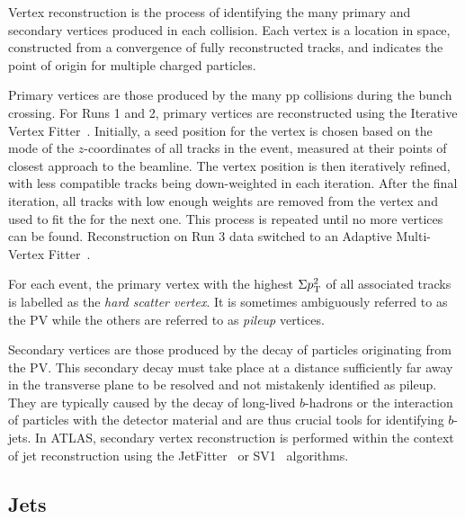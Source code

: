 Vertex reconstruction is the process of identifying the many primary and secondary vertices produced in each collision.
Each vertex is a location in space, constructed from a convergence of fully reconstructed tracks, and indicates the point of origin for multiple charged particles.

Primary vertices are those produced by the many \Gls{pp} collisions during the bunch crossing.
For Runs 1 and 2, primary vertices are reconstructed using the Iterative Vertex Fitter~\cite{ATLASVertex}.
Initially, a seed position for the vertex is chosen based on the mode of the $z$-coordinates of all tracks in the event, measured at their points of closest approach to the beamline.
The vertex position is then iteratively refined, with less compatible tracks being down-weighted in each iteration.
After the final iteration, all tracks with low enough weights are removed from the vertex and used to fit the for the next one.
This process is repeated until no more vertices can be found.
Reconstruction on Run 3 data switched to an Adaptive Multi-Vertex Fitter~\cite{Run3Vertex}.

For each event, the primary vertex with the highest $\Sigma p_\mathrm{T}^2$ of all associated tracks is labelled as the \textit{hard scatter vertex}.
It is sometimes ambiguously referred to as the \Gls{PV} while the others are referred to as \textit{pileup} vertices.

Secondary vertices are those produced by the decay of particles originating from the \Gls{PV}.
This secondary decay must take place at a distance sufficiently far away in the transverse plane to be resolved and not mistakenly identified as pileup.
They are typically caused by the decay of long-lived $b$-hadrons or the interaction of particles with the detector material and are thus crucial tools for identifying $b$-jets.
In ATLAS, secondary vertex reconstruction is performed within the context of jet reconstruction using the JetFitter~\cite{JetFitter} or SV1~\cite{SV1} algorithms.

\subsection{Jets}
\label{sec:jets_reconstruction}

